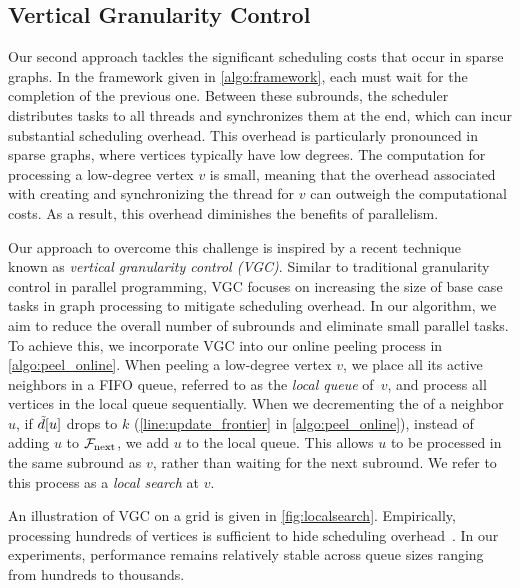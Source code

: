\subsection{Vertical Granularity Control}\label{sec:vgc}



Our second approach tackles the significant scheduling costs that occur in sparse graphs. 
In the framework given in \cref{algo:framework}, each \subround{} must wait for the completion of the previous one. 
Between these subrounds, the scheduler distributes tasks to all threads and synchronizes them at the end, which can incur substantial scheduling overhead. 
This overhead is particularly pronounced in sparse graphs, where vertices typically have low degrees. 
The computation for processing a low-degree vertex $v$ is small, meaning that the overhead associated with creating and synchronizing the thread for $v$ can outweigh the computational costs. 
As a result, this overhead diminishes the benefits of parallelism.

Our approach to overcome this challenge is inspired by a recent technique~\cite{wang2023parallel,dong2024pasgal} known as \emph{vertical granularity control (VGC)}. 
Similar to traditional granularity control in parallel programming, VGC focuses on increasing the size of base case tasks in graph processing to mitigate scheduling overhead. 
In our \kcore{} algorithm, we aim to reduce the overall number of subrounds and eliminate small parallel tasks. 
To achieve this, we incorporate VGC into our online peeling process in \cref{algo:peel_online}.
When peeling a low-degree vertex $v$, we place all its active neighbors in a FIFO queue, referred to as the \emph{local queue} of~$v$, 
and process all vertices in the local queue sequentially. 
When we decrementing the \induceddegree{} of a neighbor $u$,  
if $\tilde{d}[u]$ drops to $k$ (\cref{line:update_frontier} in \cref{algo:peel_online}),
instead of adding $u$ to $\mathcal{F}_{\text{next}}$, we add $u$ to the local queue. 
This allows $u$ to be processed in the same subround as $v$, rather than waiting for the next subround.
We refer to this process as a \emph{local search} at $v$. 

An illustration of VGC on a grid is given in \cref{fig:localsearch}. 
Empirically, processing hundreds of vertices is sufficient to hide scheduling overhead~\cite{wang2023parallel}. 
In our experiments, performance remains relatively stable across queue sizes ranging from hundreds to thousands.

